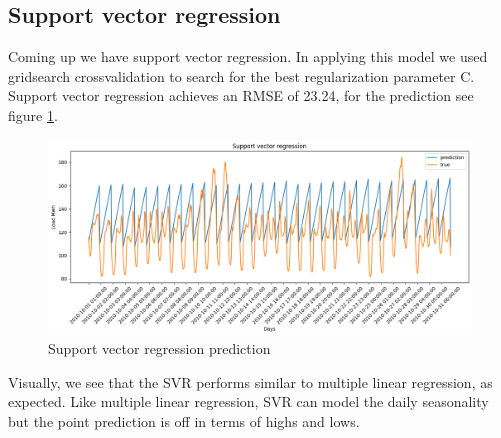 \subsection{Support vector regression}
Coming up we have support vector regression. In applying this model we used gridsearch crossvalidation to search for the best regularization parameter C. Support vector regression achieves an RMSE of 23.24, for the prediction see figure \ref{fig:svr_price}.
\begin{figure}[!h]
    \includegraphics[width=\textwidth]{images/svr_price.png}
    \caption{Support vector regression prediction}
    \label{fig:svr_price}
\end{figure}
Visually, we see that the SVR performs similar to multiple linear regression, as expected. Like multiple linear regression, SVR can model the daily seasonality but the point prediction is off in terms of highs and lows.


